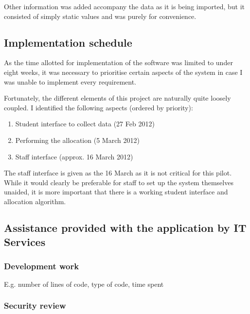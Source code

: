 \documentclass[draft]{scrartcl}
\begin{document}
Other information was added accompany the data as it is being imported, but it
consisted of simply static values and was purely for convenience.



\subsection{Implementation schedule}

As the time allotted for implementation of the software was limited to under
eight weeks, it was necessary to prioritise certain aspects of the system in
case I was unable to implement every requirement.

Fortunately, the different elements of this project are naturally quite
loosely coupled. I identified the following aspects (ordered by priority):

\begin{enumerate}
  \item Student interface to collect data (27 Feb 2012)
  \item Performing the allocation (5 March 2012)
  \item Staff interface (approx. 16 March 2012)
\end{enumerate}

The staff interface is given as the 16 March as it is not critical for this
pilot. While it would clearly be preferable for staff to set up the system
themselves unaided, it is more important that there is a working student
interface and allocation algorithm.

\subsection{Assistance provided with the application by IT Services}

\subsubsection{Development work}

E.g. number of lines of code, type of code, time spent



\subsubsection{Security review}
\end{document}
